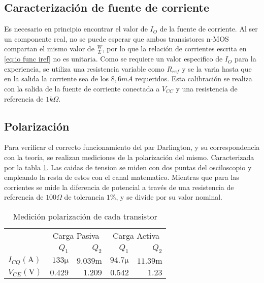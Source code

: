 \subsection{Caracterización de fuente de corriente}

Es necesario en principio encontrar el valor de $I_O$ de la fuente de corriente. Al ser un componente real, no se puede esperar que ambos transistores n-MOS compartan el mismo valor de $\frac{W}{L}$, por lo que la relación de corrientes escrita en \ref{eq:io func iref} no es unitaria.
Como se requiere un valor especifico de $I_O$ para la experiencia, se utiliza una resistencia variable como $R_{ref}$ y se la varia hasta que en la salida la corriente sea de los $8,6 mA$ requeridos. Esta calibración se realiza con la salida de la fuente de corriente conectada a $V_{CC}$ y una resistencia de referencia de $1k\Omega$.

\subsection{Polarización}

Para verificar el correcto funcionamiento del par Darlington, y su correspondencia con la teoría, se realizan mediciones de la polarización del mismo. Caracterizada por la tabla \ref{table:pola medida}. Las caidas de tension se miden con dos puntas del osciloscopio y empleando la resta de estos con el canal matematico.
Mientras que para las corrientes se mide la diferencia de potencial a través de  una resistencia de referencia de $100 \Omega$ de tolerancia $1\%$, y se divide por su valor nominal.

\begin{table}[ht]
    \centering
    \begin{tabular}{|l|r|r|r|r|}
        \hline
        \multirow{2}{*}{} & \multicolumn{2}{c|}{Carga Pasiva} & \multicolumn{2}{c|}{Carga Activa} \\ \cline{2-5} 
         & $Q_1$ & $Q_2$ & $Q_1$ & $Q_2$ \\ \hline

        $I_{CQ} (\si{\ampere})$ & $133 \si{\micro}$& $9.039\si{\milli}$ & $94.7 \si{\micro}$& $11.39\si{\milli}$\\
        $V_{CE} (\si{\volt})$   & $0.429$            & $1.209$ & $0.542$ & $1.23$ \\ \hline       
    \end{tabular}
    \caption{Medición polarización de cada transistor}
    \label{table:pola medida}
\end{table}

